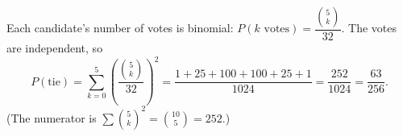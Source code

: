 Each candidate's number of votes is binomial: $P(k\text{ votes})=\dfrac{\binom5k}{32}$. The votes are independent, so
\[
P(\text{tie})=\sum_{k=0}^{5}\left(\dfrac{\binom5k}{32}\right)^2=\dfrac{1+25+100+100+25+1}{1024}=\dfrac{252}{1024}=\boxed{\dfrac{63}{256}}.
\]
(The numerator is $\sum\binom5k^2=\binom{10}{5}=252$.)

